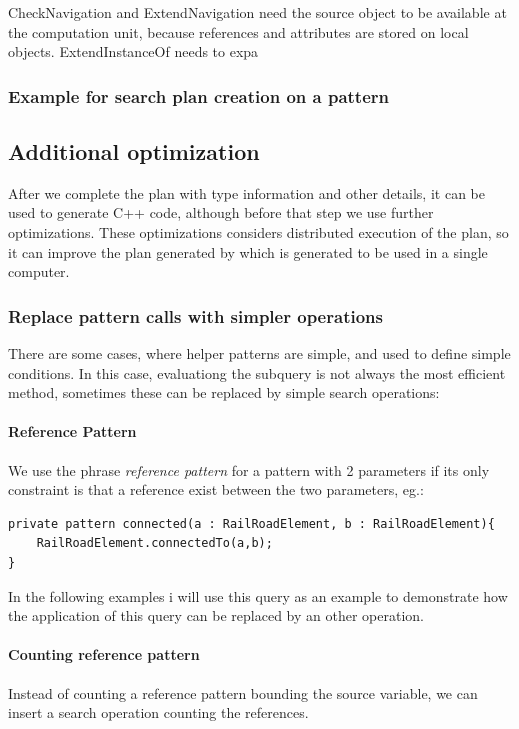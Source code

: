CheckNavigation and ExtendNavigation need the source object to be available at the computation unit, because references and attributes are stored on local objects.
ExtendInstanceOf needs to expa

\subsubsection{Example for search plan creation on a pattern }


\subsection{Additional optimization}

After we complete the plan with type information and other details, it can be used to generate C++ code, although before that step we use further optimizations. 
These optimizations considers distributed execution of the plan, so it can improve the plan generated by \viatra{} which is generated to be used in a single computer.


\subsubsection{Replace pattern calls with simpler operations}
There are some cases, where helper patterns are simple, and used to define simple conditions. 
In this case, evaluationg the subquery is not always the most efficient method, sometimes these can be replaced by simple search operations:

\paragraph{Reference Pattern}
We use the phrase \emph{reference pattern} for a pattern with 2 parameters if its only constraint is that a reference exist between the two parameters, eg.:
\begin{lstlisting}[language = vql]
private pattern connected(a : RailRoadElement, b : RailRoadElement){
	RailRoadElement.connectedTo(a,b);
}
\end{lstlisting}

In the following examples i will use this query as an example to demonstrate how the application of this query can be replaced by an other operation.

\paragraph{Counting reference pattern} 
Instead of counting a reference pattern bounding the source variable, we can insert a search operation counting the references.

